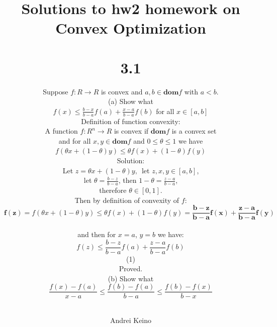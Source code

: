 \documentclass{article}
\begin{document}
\title{Solutions to hw2 homework on Convex Optimization %
\author{Andrei Keino}
\maketitle
\section*{3.1}
Suppose $f: R \rightarrow R$ is convex and $a, b \in \boldsymbol{dom} f$ with $a < b$. \\

(a) Show what \\
$f(x) \leq \frac{b - x}{b - a}f(a) + \frac{x - a}{b - a}f(b)$
for all $x \in [a, b]$\\

Definition of function convexity: \\

A function $f: R^n \rightarrow R$ is convex if $\boldsymbol{dom} f$ is a convex set \\ and for all $x, y \in \boldsymbol{dom} f$ and $0 \leq \theta \leq 1$ we have \\
$f(\theta x + (1 - \theta)y) \leq \theta f(x) + (1 - \theta) f(y)$ \\

Solution:\\

Let $z = \theta x + (1- \theta)y, \, $ let 
$z, x, y\in [a, b]$, \\
let $\theta = \frac{b - z}{b - a}$, 
then $1 - \theta = \frac{z - a}{b - a}$, \\therefore $\theta \in [0, 1]$. \\
Then by definition of convexity of $f$:\\
$$\boldsymbol{f(z)} = f(\theta x + (1- \theta)y) \leq 
\theta f(x) + (1 - \theta) f(y)  = 
\boldsymbol{\frac{b - z}{b - a} f(x) + \frac{z - a}{b - a} f(y)}$$
\\ and then for $x = a$, $y = b$ we have: \\
$$f(z) \leq \frac{b - z}{b - a} f(a) + \frac{z - a}{b - a} f(b)$$ (1)
\\ Proved. \\

(b) Show what \\
$$ \frac{f(x) - f(a)}{x - a} \leq \frac{f(b) - f(a)}{b - a} \leq \frac{f(b) - f(x)}{b - x}$$ \\

}
\end{document}
